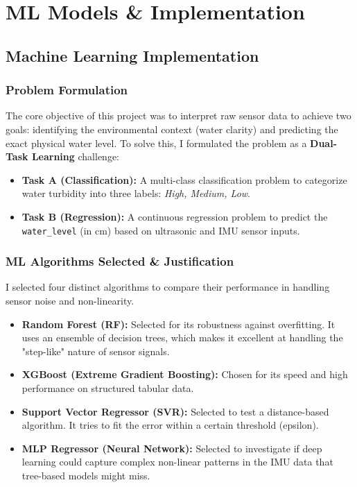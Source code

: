 \documentclass[12pt, a4paper]{article}
\begin{document}
\clearpage
\section{ML Models \& Implementation}

\subsection{Machine Learning Implementation}

\subsubsection{Problem Formulation}
The core objective of this project was to interpret raw sensor data to achieve two goals: identifying the environmental context (water clarity) and predicting the exact physical water level. To solve this, I formulated the problem as a \textbf{Dual-Task Learning} challenge:
\begin{itemize}
    \item \textbf{Task A (Classification):} A multi-class classification problem to categorize water turbidity into three labels: \textit{High, Medium, Low}.
    \item \textbf{Task B (Regression):} A continuous regression problem to predict the \texttt{water\_level} (in cm) based on ultrasonic and IMU sensor inputs.
\end{itemize}

\subsubsection{ML Algorithms Selected \& Justification}
I selected four distinct algorithms to compare their performance in handling sensor noise and non-linearity.
\begin{itemize}
    \item \textbf{Random Forest (RF):} Selected for its robustness against overfitting. It uses an ensemble of decision trees, which makes it excellent at handling the "step-like" nature of sensor signals.
    \item \textbf{XGBoost (Extreme Gradient Boosting):} Chosen for its speed and high performance on structured tabular data.
    \item \textbf{Support Vector Regressor (SVR):} Selected to test a distance-based algorithm. It tries to fit the error within a certain threshold (epsilon).
    \item \textbf{MLP Regressor (Neural Network):} Selected to investigate if deep learning could capture complex non-linear patterns in the IMU data that tree-based models might miss.
\end{itemize}
\end{document}
